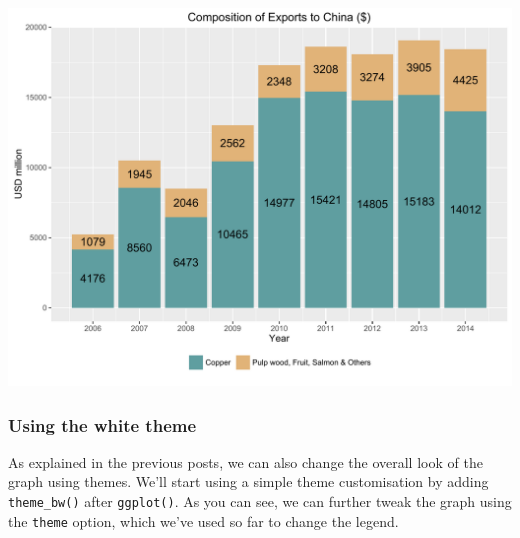 \documentclass[]{article}
\begin{document}
\begin{center}\includegraphics{0_all_posts_pdf/bar_8-1} \end{center}

\subsubsection{Using the white theme}\label{using-the-white-theme-2}

As explained in the previous posts, we can also change the overall look
of the graph using themes. We'll start using a simple theme
customisation by adding \texttt{theme\_bw()} after \texttt{ggplot()}. As
you can see, we can further tweak the graph using the \texttt{theme}
option, which we've used so far to change the legend.
\end{document}
